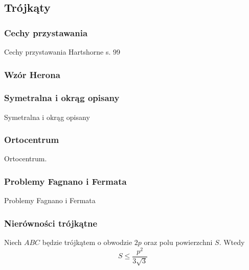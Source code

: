 \subsection{Trójkąty}

\subsubsection{Cechy przystawania}
Cechy przystawania
\loremipsum
Hartshorne s. 99







\subsubsection{Wzór Herona}


\subsubsection{Symetralna i okrąg opisany}
Symetralna i okrąg opisany
\loremipsum

\subsubsection{Ortocentrum}
Ortocentrum.
\loremipsum

\subsubsection{Problemy Fagnano i Fermata}
Problemy Fagnano i Fermata
\loremipsum

\subsubsection{Nierówności trójkątne}

\begin{proposition}
	Niech $ABC$ będzie trójkątem o obwodzie $2p$ oraz polu powierzchni $S$.
	Wtedy
	\begin{equation}
		S \le \frac{p^2}{3 \sqrt{3}}
	\end{equation}
\end{proposition}


